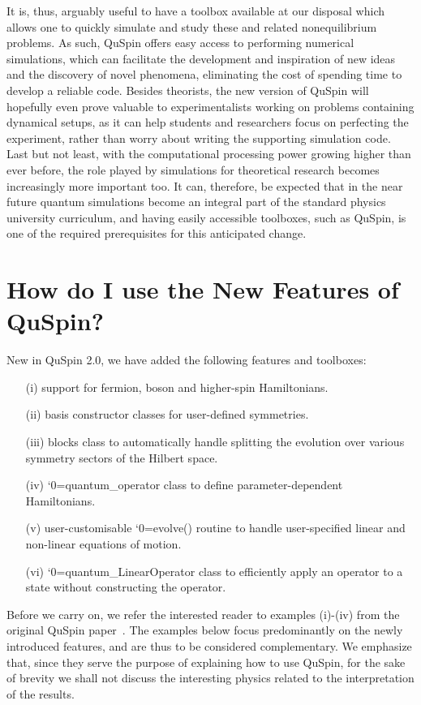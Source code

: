 \documentclass{SciPost}
\newcommand\0{\scalebox{-1}[1]{0}}
\let\svttfamily\ttfamily
\renewcommand\ttfamily{\svttfamily\catcode`0=\active }
\renewcommand\texttt{\bgroup\ttfamily\texttthelp}
\def\texttthelp#1{#1\egroup}
\begin{document}
It is, thus, arguably useful to have a toolbox available at our disposal which allows one to quickly simulate and study these and related nonequilibrium problems. As such, QuSpin offers easy access to performing numerical simulations, which can facilitate the development and inspiration of new ideas and the discovery of novel phenomena, eliminating the cost of spending time to develop a reliable code. Besides theorists, the new version of QuSpin will hopefully even prove valuable to experimentalists working on problems containing dynamical setups, as it can help students and researchers focus on perfecting the experiment, rather than worry about writing the supporting simulation code. Last but not least, with the computational processing power growing higher than ever before, the role played by simulations for theoretical research becomes increasingly more important too. It can, therefore, be expected that in the near future quantum simulations become an integral part of the standard physics university curriculum, and having easily accessible toolboxes, such as QuSpin, is one of the required prerequisites for this anticipated change.


\section{How do I use the New Features of QuSpin?}
\label{sec:examples}

New in QuSpin 2.0, we have added the following features and toolboxes:
\begin{itemize}
	\item[(i)] support for fermion, boson and higher-spin Hamiltonians.
	\item[(ii)] basis constructor classes for user-defined symmetries.
	\item[(iii)] blocks class to automatically handle splitting the evolution over various symmetry sectors of the Hilbert space.
	\item[(iv)] \texttt{quantum\_operator} class to define parameter-dependent Hamiltonians.
	\item[(v)] user-customisable \texttt{evolve()} routine to handle user-specified linear and non-linear equations of motion.
	\item[(vi)] \texttt{quantum\_LinearOperator} class to efficiently apply an operator to a state without constructing the operator.
\end{itemize}

\noindent Before we carry on, we refer the interested reader to examples (i)-(iv) from the original QuSpin paper~\cite{weinberg_17_quspin}. The examples below focus predominantly on the newly introduced features, and are thus to be considered complementary. We emphasize that, since they serve the purpose of explaining how to use QuSpin, for the sake of brevity we shall not discuss the interesting physics related to the interpretation of the results.\\
\end{document}
